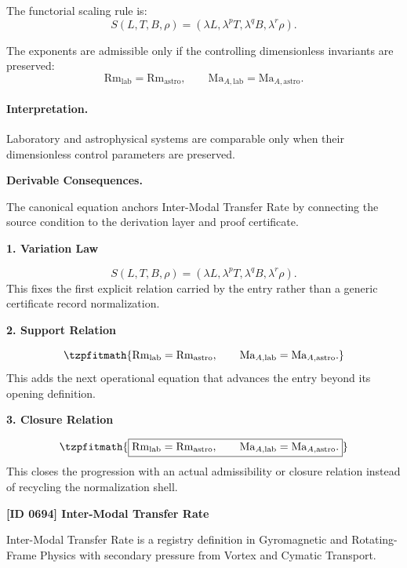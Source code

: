 The functorial scaling rule is:
\begin{equation}
S(L,T,B,\rho)
=
(\lambda L,\lambda^{p}T,\lambda^{q}B,\lambda^{r}\rho).
\end{equation}

The exponents are admissible only if the controlling dimensionless invariants are preserved:
\begin{equation}
\boxed{
\mathrm{Rm}_{\mathrm{lab}}=\mathrm{Rm}_{\mathrm{astro}},
\qquad
\mathrm{Ma}_{A,\mathrm{lab}}=\mathrm{Ma}_{A,\mathrm{astro}}.
}
\end{equation}

\paragraph{Interpretation.}
Laboratory and astrophysical systems are comparable only when their dimensionless control parameters are preserved.

\par\vspace{0.35em}
\noindent\textbf{Derivable Consequences.}\quad
\begingroup
\footnotesize
\raggedright
The canonical equation anchors Inter-Modal Transfer Rate by connecting the source condition to the derivation layer and proof certificate.
\par\endgroup

\noindent\textbf{1. Variation Law}\par
\[
S(L,T,B,\rho) = (\lambda L,\lambda^{p}T,\lambda^{q}B,\lambda^{r}\rho).
\]
\noindent This fixes the first explicit relation carried by the entry rather than a generic certificate record normalization.\par
\noindent\textbf{2. Support Relation}\par
\[
\tzpfitmath{\mathrm{Rm}_{\mathrm{lab}}=\mathrm{Rm}_{\mathrm{astro}}, \qquad \mathrm{Ma}_{A,\mathrm{lab}}=\mathrm{Ma}_{A,\mathrm{astro}}.}
\]
\noindent This adds the next operational equation that advances the entry beyond its opening definition.\par
\noindent\textbf{3. Closure Relation}\par
\[
\tzpfitmath{\boxed{ \mathrm{Rm}_{\mathrm{lab}}=\mathrm{Rm}_{\mathrm{astro}}, \qquad \mathrm{Ma}_{A,\mathrm{lab}}=\mathrm{Ma}_{A,\mathrm{astro}}. }}
\]
\noindent This closes the progression with an actual admissibility or closure relation instead of recycling the normalization shell.\par

\clearpage
\noindent\textbf{[ID 0694] Inter-Modal Transfer Rate}\par
\vspace{0.35em}
\begingroup\small
{}
Inter-Modal Transfer Rate is a registry definition in Gyromagnetic and Rotating-Frame Physics with secondary pressure from Vortex and Cymatic Transport.

